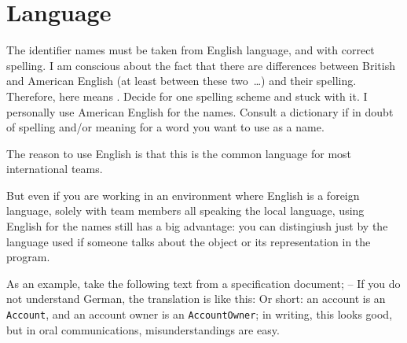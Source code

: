 \section{Language}\label{sec:Language}
The identifier names must be taken from English language, and with correct spelling. I am conscious about the fact that there are differences between British and American English (at least between these two~…) and their spelling. Therefore,  here means . Decide for one spelling scheme and stuck with it. I personally use American English for the names. Consult a dictionary if in doubt of spelling and/or meaning for a word you want to use as a name.

The reason to use English is that this is the common language for most international teams.

But even if you are working in an environment where English is a foreign language, solely with team members all speaking the local language, using English for the names still has a big advantage: you can distingiush just by the language used if someone talks about the  object or its representation in the program.

As an example, take the following text from a specification document;  – If you do not understand German, the translation is like this:  Or short: an account is an \lstinline|Account|, and an account owner is an \lstinline|AccountOwner|; in writing, this looks good, but in oral communications, misunderstandings are easy.

